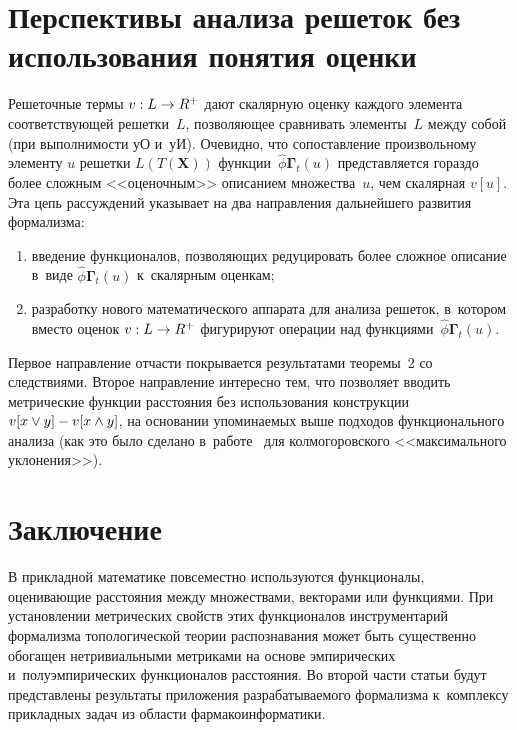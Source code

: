 \begin{multicols}{2}
\section{Перспективы анализа решеток без использования понятия 
оценки}

    Решеточные термы $v: L\hm\to R^+$ дают скалярную оцен\-ку каж\-до\-го 
элемента со\-от\-вет\-ст\-ву\-ющей решетки~$L$, позволяющее сравнивать 
элементы~$L$ меж\-ду собой (при вы\-пол\-ни\-мости уО и~уИ). Очевидно, что 
со\-по\-став\-ле\-ние произвольному элементу $u$ решетки $L(T(\mathbf{X}))$ 
функции~$\hat{\phi}\bm{\Gamma}_t(u)$ представляется гораздо более сложным 
<<оценочным>> описанием множества~$u$, чем скалярная $v[u]$. Эта цепь 
рас\-суж\-де\-ний указывает на два на\-прав\-ле\-ния дальнейшего развития формализма: 
\begin{enumerate}[(1)]
\item введение функционалов, поз\-во\-ля\-ющих редуцировать более слож\-ное 
описание в~виде $\hat{\phi}\bm{\Gamma}_t(u)$ к~скалярным оценкам; 
\item разработку нового математического аппарата для анализа решеток, 
в~котором вмес\-то оценок $v: L\hm\to R^+$ фигурируют операции над 
функциями~$\hat{\phi}\bm{\Gamma}_t(u)$.
\end{enumerate}
     
     Первое направление отчасти покрывается результатами тео\-ре\-мы~2 со 
следствиями. Второе направление интересно тем, что позволяет вводить 
мет\-ри\-че\-ские функции рас\-сто\-яния без использования конструкции $v[x\vee 
y]\hm- v[x\wedge y]$, на основании упо\-ми\-на\-емых выше подходов 
функционального анализа (как это было сделано в~работе~\cite{4-tr} для 
колмогоровского <<максимального уклонения>>). 

\section{Заключение }

    В прикладной математике повсеместно используются функционалы, 
оценивающие расстояния между множествами, векторами или функциями. При 
установлении метрических свойств этих функционалов инструментарий 
формализма топологической тео\-рии распознавания может быть существенно 
обогащен нетривиальными метриками на основе эмпирических  
и~по\-лу\-эм\-пи\-ри\-че\-ских функционалов расстояния. Во второй части 
статьи будут пред\-став\-ле\-ны результаты приложения раз\-ра\-ба\-ты\-ва\-емо\-го 
формализма к~комплексу при\-клад\-ных задач из об\-ласти фармакоинформатики.


\end{multicols}
